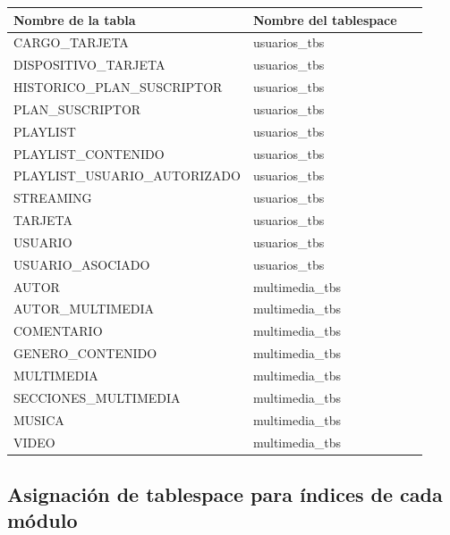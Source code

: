 \documentclass{article}
\def\arraystretch{1}
\begin{document}
{
  \setlength\tabcolsep{3.5mm}
  \def\arraystretch{2}          %
  \begin{longtable}{
    |p{0.42\linewidth}
    |p{0.5\linewidth}|}
  \hline
  \textbf{Nombre de la tabla} & 
  \textbf{Nombre del tablespace}
  \\ \hline
  CARGO\_TARJETA & 
  usuarios\_tbs%
  \\ \hline
  DISPOSITIVO\_TARJETA & 
  usuarios\_tbs%
  \\ \hline
  HISTORICO\_PLAN\_SUSCRIPTOR & 
  usuarios\_tbs%
  \\ \hline
  PLAN\_SUSCRIPTOR & 
  usuarios\_tbs%
  \\ \hline
  PLAYLIST & 
  usuarios\_tbs%
  \\ \hline
  PLAYLIST\_CONTENIDO & 
  usuarios\_tbs%
  \\ \hline
  PLAYLIST\_USUARIO\_AUTORIZADO & 
  usuarios\_tbs%
  \\ \hline
  STREAMING & 
  usuarios\_tbs%
  \\ \hline
  TARJETA & 
  usuarios\_tbs%
  \\ \hline
  USUARIO & 
  usuarios\_tbs%
  \\ \hline
  USUARIO\_ASOCIADO & 
  usuarios\_tbs%
  \\ \hline
  AUTOR & 
  multimedia\_tbs 
  \\ \hline
  AUTOR\_MULTIMEDIA & 
  multimedia\_tbs 
  \\ \hline
  COMENTARIO & 
  multimedia\_tbs 
  \\ \hline
  GENERO\_CONTENIDO & 
  multimedia\_tbs 
  \\ \hline
  MULTIMEDIA & 
  multimedia\_tbs 
  \\ \hline
  SECCIONES\_MULTIMEDIA & 
  multimedia\_tbs 
  \\ \hline
  MUSICA & 
  multimedia\_tbs 
  \\ \hline
  VIDEO & 
  multimedia\_tbs 
  \\ \hline

  \end{longtable}
}

\newpage

\subsection{Asignación de tablespace para índices de cada módulo}
\end{document}
